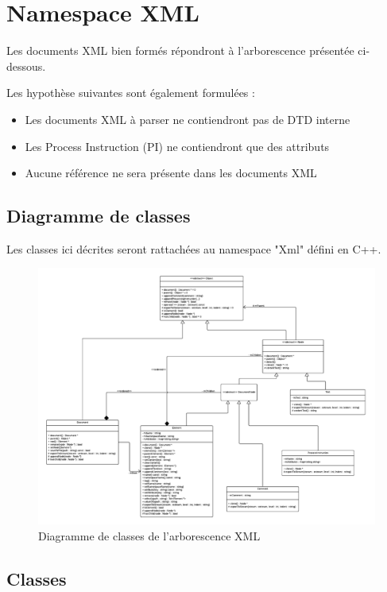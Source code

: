 \chapter{Namespace XML}

Les documents XML bien formés répondront à l'arborescence présentée ci-dessous.

Les hypothèse suivantes sont également formulées :
\begin{itemize}
    \item Les documents XML à parser ne contiendront pas de DTD interne
    \item Les Process Instruction (PI) ne contiendront que des attributs
    \item Aucune référence ne sera présente dans les documents XML\\
\end{itemize}


\section{Diagramme de classes}
    Les classes ici décrites seront rattachées au namespace "Xml" défini en C++.

    \begin{landscape}
    \begin{figure}[h!]
        \centering
        \includegraphics[width=0.9\linewidth]{images/xml-uml.pdf}
        \caption{Diagramme de classes de l'arborescence XML}
        \label{classDiagram}
    \end{figure}
    \end{landscape}


\section{Classes}
